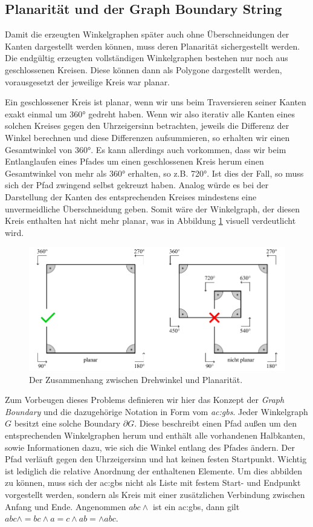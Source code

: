 \subsection{Planarität und der Graph Boundary String}
Damit die erzeugten Winkelgraphen später auch ohne Überschneidungen der Kanten dargestellt werden können, muss deren Planarität sichergestellt
werden. Die endgültig erzeugten vollständigen Winkelgraphen bestehen nur noch aus geschlossenen Kreisen. Diese können dann als Polygone
dargestellt werden, vorausgesetzt der jeweilige Kreis war planar.

Ein geschlossener Kreis ist planar, wenn wir uns beim Traversieren seiner Kanten exakt einmal um 360° gedreht haben. Wenn wir also iterativ
alle Kanten eines solchen Kreises gegen den Uhrzeigersinn betrachten, jeweils die Differenz der Winkel berechnen und diese Differenzen
aufsummieren, so erhalten wir einen Gesamtwinkel von 360°. Es kann allerdings auch vorkommen, dass wir beim Entlanglaufen eines Pfades um
einen geschlossenen Kreis herum einen Gesamtwinkel von mehr als 360° erhalten, so z.B. 720°. Ist dies der Fall, so muss sich der Pfad zwingend
selbst gekreuzt haben. Analog würde es bei der Darstellung der Kanten des entsprechenden Kreises mindestens eine unvermeidliche Überschneidung
geben. Somit wäre der Winkelgraph, der diesen Kreis enthalten hat nicht mehr planar, was in Abbildung \ref{fig:planarity} visuell verdeutlicht wird.

\begin{figure}[t]
    \centering
    \includegraphics[width=(\imgWidth*3/4)]{images/planarity.pdf}
    \caption{Der Zusammenhang zwischen Drehwinkel und Planarität.}
    \label{fig:planarity}
\end{figure}

Zum Vorbeugen dieses Problems definieren wir hier das Konzept der \textit{Graph Boundary} und die dazugehörige Notation in Form vom
\textit{\gls{ac:gbs}}. Jeder Winkelgraph \(G\) besitzt eine solche Boundary \(\partial G\). Diese beschreibt einen Pfad außen um den entsprechenden
Winkelgraphen herum und enthält alle vorhandenen Halbkanten, sowie Informationen dazu, wie sich die Winkel entlang des Pfades ändern.
Der Pfad verläuft gegen den Uhrzeigersinn und hat keinen festen Startpunkt. Wichtig ist lediglich die relative Anordnung der enthaltenen
Elemente. Um dies abbilden zu können, muss sich der \gls{ac:gbs} nicht als Liste mit festem Start- und Endpunkt vorgestellt werden,
sondern als Kreis mit einer zusätzlichen Verbindung zwischen Anfang und Ende. Angenommen \(abc\wedge\) ist ein \gls{ac:gbs}, dann gilt
\(abc\wedge = bc\wedge a = c\wedge ab = \wedge abc\).

